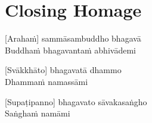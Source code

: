 \chapter{Closing Homage}

[Arahaṁ] sammāsambuddho bhagavā\\
Buddhaṁ bhagavantaṁ abhivādemi

\begin{cprenglish}
\end{cprenglish}

[Svākkhāto] bhagavatā dhammo\\
Dhammaṁ namassāmi

\begin{cprenglish}
\end{cprenglish}

[Supaṭipanno] bhagavato sāvakasaṅgho\\
Saṅghaṁ namāmi

\begin{cprenglish}
\end{cprenglish}
